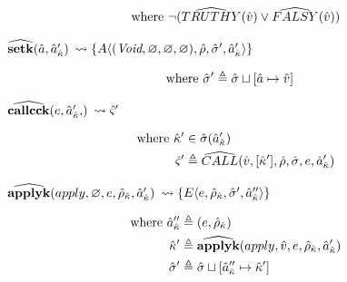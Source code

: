 \documentclass[12pt,draft]{article}
\newcommand{\E}[4]{E\langle #1 , #2 , #3 , #4 \rangle}
\newcommand{\A}[4]{A\langle #1 , #2 , #3 , #4 \rangle}
\begin{document}
\begin{multicols*}{2}
\begin{center}
  \end{center}
  \vspace{-7mm}
  \begin{align*}
    \text{where } \neg (\widehat{TRUTHY}(\hat{v}) \lor \widehat{FALSY}(\hat{v}))
  \end{align*}
  \begin{center}
    $\widehat{\textbf{setk}}(\hat{a} , \hat{a}_{\hat{\kappa}}')$
    $\leadsto \{ \A{(\cVoid , \varnothing , \varnothing , \varnothing)}{\aenv}{\astore'}{\akaddr'} \}$
  \end{center}
  \vspace{-7mm}
  \begin{align*}
    \text{where }
    \hat{\sigma}' &\triangleq \hat{\sigma} \sqcup [\hat{a} \mapsto \hat{v}]
  \end{align*}
  \begin{center}
    $\acallcck{e , \akaddr'}$
    $\leadsto \hat{\varsigma}' $
  \end{center}
  \vspace{-7mm}
  \begin{align*}
    \text{where }
    \hat{\kappa}' &\in \hat{\sigma}(\hat{a}_{\hat{\kappa}}') \\
    \hat{\varsigma}' &\triangleq \widehat{CALL}(\hat{v} , [\hat{\kappa}'] ,
               \hat{\rho} , \hat{\sigma} , e , \hat{a}_{\hat{\kappa}}') \\
  \end{align*}
  \vfill\null
  \columnbreak
  \begin{center}
    $\widehat{\textbf{applyk}}(apply , \varnothing , e , \hat{\rho}_{\hat{\kappa}} , \hat{a}_{\hat{\kappa}}')$
    $\leadsto \{ \E{e}{\aenv_{\akont}}{\astore'}{\akaddr''} \}$
  \end{center}
  \vspace{-7mm}
  \begin{align*}
    \text{where }
    \hat{a}_{\hat{\kappa}}'' &\triangleq (e , \hat{\rho}_{\hat{\kappa}}) \\
    \hat{\kappa}' &\triangleq \widehat{\textbf{applyk}}(apply , \hat{v} , e , \hat{\rho}_{\hat{\kappa}} , \hat{a}_{\hat{\kappa}}') \\
    \hat{\sigma}' &\triangleq \hat{\sigma} \sqcup [\hat{a}_{\hat{\kappa}}'' \mapsto \hat{\kappa}']
  \end{align*}
  \begin{center}

\end{center}
\end{multicols*}
\end{document}
